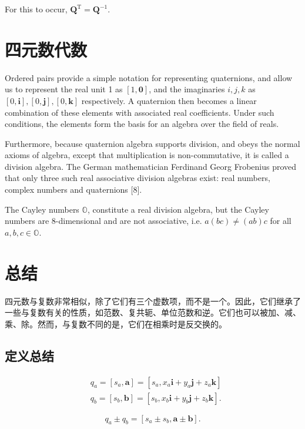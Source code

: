 For this to occur, $\mathbf{Q}^{\mathrm{T}}=\mathbf{Q}^{-1}$.

\section{四元数代数}
Ordered pairs provide a simple notation for representing quaternions, and allow us to represent the real unit 1 as $[1, \mathbf{0}]$, and the imaginaries $i, j, k$ as $[0, \mathbf{i}],[0, \mathbf{j}],[0, \mathbf{k}]$ respectively. A quaternion then becomes a linear combination of these elements with associated real coefficients. Under such conditions, the elements form the basis for an algebra over the field of reals.

Furthermore, because quaternion algebra supports division, and obeys the normal axioms of algebra, except that multiplication is non-commutative, it is called a division algebra. The German mathematician Ferdinand Georg Frobenius proved that only three such real associative division algebras exist: real numbers, complex numbers and quaternions [8].

The Cayley numbers $\mathbb{O}$, constitute a real division algebra, but the Cayley numbers are 8-dimensional and are not associative, i.e. $a(b c) \neq(a b) c$ for all $a, b, c \in \mathbb{O}$.

\section{总结}
四元数与复数非常相似，除了它们有三个虚数项，而不是一个。因此，它们继承了一些与复数有关的性质，如范数、复共轭、单位范数和逆。它们也可以被加、减、乘、除。然而，与复数不同的是，它们在相乘时是反交换的。

\subsection{定义总结}
\begin{tcolorbox}[breakable, enhanced,title = {四元数}]
    $$
        \begin{aligned}
             & q_{a}=\left[s_{a}, \mathbf{a}\right]=\left[s_{a}, x_{a} \mathbf{i}+y_{a} \mathbf{j}+z_{a} \mathbf{k}\right]   \\
             & q_{b}=\left[s_{b}, \mathbf{b}\right]=\left[s_{b}, x_{b} \mathbf{i}+y_{b} \mathbf{j}+z_{b} \mathbf{k}\right] .
        \end{aligned}
    $$
\end{tcolorbox}


\begin{tcolorbox}[breakable, enhanced,title = {加减法}]
    $$
        q_{a} \pm q_{b}=\left[s_{a} \pm s_{b}, \mathbf{a} \pm \mathbf{b}\right] .
    $$
\end{tcolorbox}

